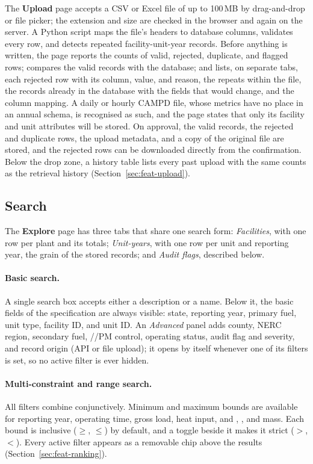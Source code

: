 \documentclass[11pt,a4paper]{article}
\begin{document}
The \textbf{Upload} page accepts a CSV or Excel file of up to 100\,MB by drag-and-drop or file
picker; the extension and size are checked in the browser and again on the server. A Python
script maps the file's headers to database columns, validates every row, and detects repeated
facility-unit-year records. Before anything is written, the page reports the counts of valid,
rejected, duplicate, and flagged rows; compares the valid records with the database; and lists,
on separate tabs, each rejected row with its column, value, and reason, the repeats within the
file, the records already in the database with the fields that would change, and the column
mapping. A daily or hourly CAMPD file, whose metrics have no place in an annual schema, is
recognised as such, and the page states that only its facility and unit attributes will be
stored. On approval, the valid records, the rejected and duplicate rows, the upload metadata,
and a copy of the original file are stored, and the rejected rows can be downloaded directly
from the confirmation. Below the drop zone, a history table lists every past upload with the
same counts as the retrieval history (Section~\ref{sec:feat-upload}).

\subsection{Search}

The \textbf{Explore} page has three tabs that share one search form: \emph{Facilities}, with one
row per plant and its totals; \emph{Unit-years}, with one row per unit and reporting year, the
grain of the stored records; and \emph{Audit flags}, described below.

\paragraph{Basic search.} A single search box accepts either a description or a name. Below it,
the basic fields of the specification are always visible: state, reporting year, primary fuel,
unit type, facility ID, and unit ID. An \emph{Advanced} panel adds county, NERC region, secondary
fuel, \SOtwo/\NOx/PM control, operating status, audit flag and severity, and record origin (API
or file upload); it opens by itself whenever one of its filters is set, so no active filter is
ever hidden.

\paragraph{Multi-constraint and range search.} All filters combine conjunctively. Minimum and
maximum bounds are available for reporting year, operating time, gross load, heat input, and
\COtwo, \SOtwo, and \NOx{} mass. Each bound is inclusive ($\ge$, $\le$) by default, and a toggle
beside it makes it strict ($>$, $<$). Every active filter appears as a removable chip above the
results (Section~\ref{sec:feat-ranking}).
\end{document}
